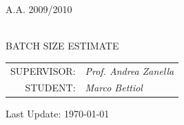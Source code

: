 \begin{titlepage}
		\vskip1.2cm\begin{center}
      \rm\large\uppercase\expandafter{A.A. 2009/2010\\}
 \end{center}
    	
    \vskip 2.5cm\begin{center}
    \HRule \\[0.4cm]\LARGE\expandafter{BATCH SIZE ESTIMATE}
    \HRule \\[0.4cm]
    \end{center}
    
    \begin{flushright}\vskip4.0cm 
    \begin{tabular}{rl}
            \rm\large \uppercase{Supervisor:} &\emph{Prof. Andrea Zanella}\\
	   \rm\large \uppercase{Student:} &\emph{Marco Bettiol} \\
		\end{tabular}
     \end{flushright}
    \vfill
          \begin{center}
                  \vskip1.0cm 
                  Last Update: \today  \hspace{1mm } \currenttime
           \end{center}
    
\end{titlepage}

\newpage

